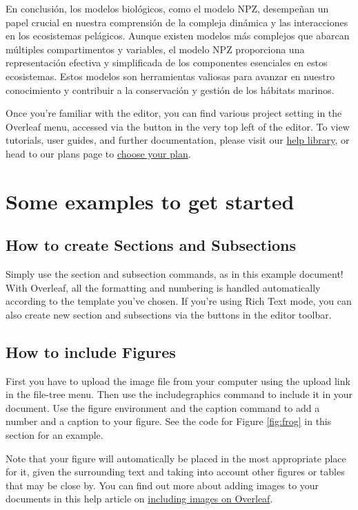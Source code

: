 \documentclass{article}
\begin{document}
En conclusión, los modelos biológicos, como el modelo NPZ, desempeñan un papel crucial en nuestra comprensión de la compleja dinámica y las interacciones en los ecosistemas pelágicos. Aunque existen modelos más complejos que abarcan múltiples compartimentos y variables, el modelo NPZ proporciona una representación efectiva y simplificada de los componentes esenciales en estos ecosistemas. Estos modelos son herramientas valiosas para avanzar en nuestro conocimiento y contribuir a la conservación y gestión de los hábitats marinos.


Once you're familiar with the editor, you can find various project setting in the Overleaf menu, accessed via the button in the very top left of the editor. To view tutorials, user guides, and further documentation, please visit our \href{https://www.overleaf.com/learn}{help library}, or head to our plans page to \href{https://www.overleaf.com/user/subscription/plans}{choose your plan}.

\section{Some examples to get started}

\subsection{How to create Sections and Subsections}

Simply use the section and subsection commands, as in this example document! With Overleaf, all the formatting and numbering is handled automatically according to the template you've chosen. If you're using Rich Text mode, you can also create new section and subsections via the buttons in the editor toolbar.

\subsection{How to include Figures}

First you have to upload the image file from your computer using the upload link in the file-tree menu. Then use the includegraphics command to include it in your document. Use the figure environment and the caption command to add a number and a caption to your figure. See the code for Figure \ref{fig:frog} in this section for an example.

Note that your figure will automatically be placed in the most appropriate place for it, given the surrounding text and taking into account other figures or tables that may be close by. You can find out more about adding images to your documents in this help article on \href{https://www.overleaf.com/learn/how-to/Including_images_on_Overleaf}{including images on Overleaf}.
\end{document}
